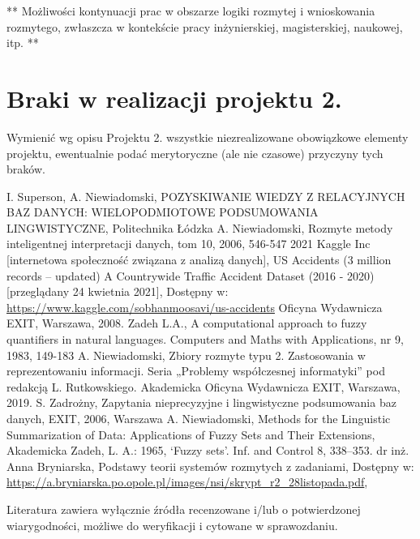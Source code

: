\documentclass{classrep}
\begin{document}
** Możliwości kontynuacji prac w obszarze logiki rozmytej i wnioskowania rozmytego, zwłaszcza w kontekście pracy inżynierskiej,
magisterskiej, naukowej, itp. **\\



\section{Braki w realizacji projektu 2.}
Wymienić wg opisu Projektu 2. wszystkie niezrealizowane obowiązkowe elementy projektu, ewentualnie
podać merytoryczne (ale nie czasowe) przyczyny tych braków. 


\begin{thebibliography}{99}
 I. Superson, A. Niewiadomski, POZYSKIWANIE WIEDZY Z RELACYJNYCH BAZ DANYCH: WIELOPODMIOTOWE PODSUMOWANIA LINGWISTYCZNE, Politechnika Łódzka
 A. Niewiadomski, Rozmyte metody inteligentnej interpretacji danych, tom 10, 2006, 546-547
 2021 Kaggle Inc [internetowa społeczność związana z analizą danych], US Accidents (3 million records -- updated)
A Countrywide Traffic Accident Dataset (2016 - 2020) [przeglądany 24 kwietnia 2021], Dostępny w: \url{https://www.kaggle.com/sobhanmoosavi/us-accidents}
Oficyna Wydawnicza EXIT, Warszawa, 2008.
 Zadeh L.A., A computational approach to fuzzy quantifiers in natural languages. Computers and Maths with Applications, nr 9, 1983, 149-183
  A. Niewiadomski, Zbiory rozmyte typu 2. Zastosowania w reprezentowaniu informacji.  Seria „Problemy współczesnej informatyki” pod redakcją L. Rutkowskiego. Akademicka Oficyna Wydawnicza EXIT, Warszawa, 2019.
 S. Zadrożny, Zapytania nieprecyzyjne i lingwistyczne podsumowania baz danych, EXIT, 2006, Warszawa
 A. Niewiadomski, Methods for the Linguistic Summarization of Data: Applications of Fuzzy Sets and Their Extensions, Akademicka 
 Zadeh, L. A.: 1965, ‘Fuzzy sets’. Inf. and Control 8, 338–353.
 dr inż. Anna Bryniarska, Podstawy teorii systemów rozmytych z zadaniami, Dostępny w: \url{https://a.bryniarska.po.opole.pl/images/nsi/skrypt_r2_28listopada.pdf},
\end{thebibliography}

Literatura zawiera wyłącznie źródła recenzowane i/lub o potwierdzonej wiarygodności,
możliwe do weryfikacji i cytowane w sprawozdaniu. 
\end{document}
